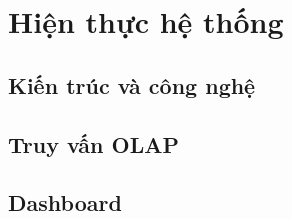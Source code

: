 \chapter{Hiện thực hệ thống}
\section{Kiến trúc và công nghệ}
\section{Truy vấn OLAP}
\section{Dashboard}
